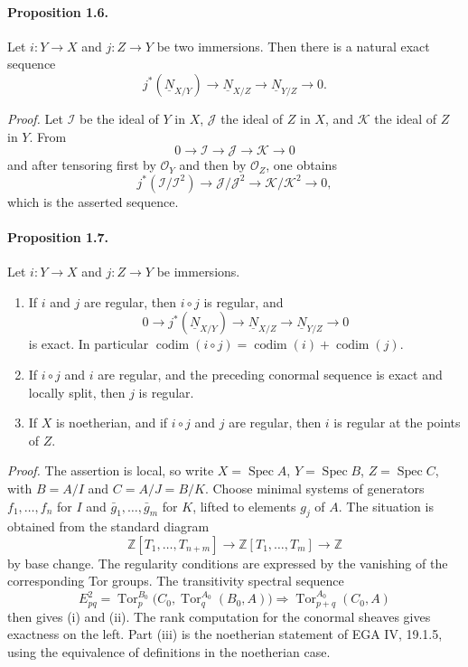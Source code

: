 \documentclass[12pt]{article}
\newcommand{\ZZ}{\mathbb Z}
\newcommand{\cO}{\mathcal O}
\newcommand{\cI}{\mathcal I}
\newcommand{\cJ}{\mathcal J}
\newcommand{\cK}{\mathcal K}
\newcommand{\Tor}{\operatorname{Tor}}
\newcommand{\Spec}{\operatorname{Spec}}
\newcommand{\codim}{\operatorname{codim}}
\begin{document}
\paragraph{Proposition 1.6.} Let $i:Y\to X$ and $j:Z\to Y$ be two immersions. Then there is a natural exact sequence
\[
j^*(\underline N_{X/Y})\longrightarrow \underline N_{X/Z}\longrightarrow \underline N_{Y/Z}\longrightarrow0.
\]

\emph{Proof.} Let $\cI$ be the ideal of $Y$ in $X$, $\cJ$ the ideal of $Z$ in $X$, and $\cK$ the ideal of $Z$ in $Y$. From
\[
0\to\cI\to\cJ\to\cK\to0
\]
and after tensoring first by $\cO_Y$ and then by $\cO_Z$, one obtains
\[
j^*(\cI/\cI^2)\to\cJ/\cJ^2\to\cK/\cK^2\to0,
\]
which is the asserted sequence.

\paragraph{Proposition 1.7.} Let $i:Y\to X$ and $j:Z\to Y$ be immersions.
\begin{enumerate}[label=\roman*)]
\item If $i$ and $j$ are regular, then $i\circ j$ is regular, and
\[
0\to j^*(\underline N_{X/Y})\to \underline N_{X/Z}\to \underline N_{Y/Z}\to0
\]
is exact. In particular $\codim(i\circ j)=\codim(i)+\codim(j)$.
\item If $i\circ j$ and $i$ are regular, and the preceding conormal sequence is exact and locally split, then $j$ is regular.
\item If $X$ is noetherian, and if $i\circ j$ and $j$ are regular, then $i$ is regular at the points of $Z$.
\end{enumerate}

\emph{Proof.} The assertion is local, so write $X=\Spec A$, $Y=\Spec B$, $Z=\Spec C$, with $B=A/I$ and $C=A/J=B/K$. Choose minimal systems of generators $f_1,\ldots,f_n$ for $I$ and $\bar g_1,\ldots,\bar g_m$ for $K$, lifted to elements $g_j$ of $A$. The situation is obtained from the standard diagram
\[
\ZZ[T_1,\ldots,T_{n+m}]\to \ZZ[T_1,\ldots,T_m]\to \ZZ
\]
by base change. The regularity conditions are expressed by the vanishing of the corresponding Tor groups. The transitivity spectral sequence
\[
E^2_{pq}=\Tor_p^{B_0}\bigl(C_0,\Tor_q^{A_0}(B_0,A)\bigr)\Longrightarrow \Tor_{p+q}^{A_0}(C_0,A)
\]
then gives (i) and (ii). The rank computation for the conormal sheaves gives exactness on the left. Part (iii) is the noetherian statement of EGA IV, 19.1.5, using the equivalence of definitions in the noetherian case.
\end{document}
